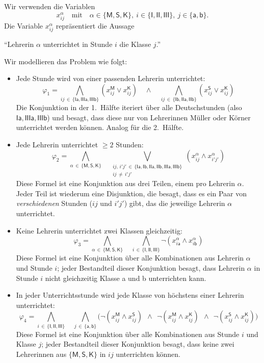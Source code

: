 \documentclass[fontsize=11pt, twoside=false, numbers=autoenddot]{scrbook}
\begin{document}
Wir verwenden die Variablen
\[
  x_{ij}^\alpha
  \quad\text{mit}\quad
  \alpha \in \{\textsf{M},\textsf{S},\textsf{K}\},~
  i \in \{\textsf{I},\textsf{II},\textsf{III}\},~
  j \in \{\textsf{a},\textsf{b}\}.
\]
Die Variable $x_{ij}^\alpha$ repräsentiert die Aussage
\begin{center}
  "`Lehrerin $\alpha$ unterrichtet in Stunde $i$ die Klasse $j$."'
\end{center}
Wir modellieren das Problem wie folgt:
\begin{itemize}
  \item
    Jede Stunde wird von einer passenden Lehrerin unterrichtet:
    \[
      \varphi_1 = 
      \bigwedge_{ij \,\in\, \{\textsf{Ia},\textsf{IIIa},\textsf{IIIb}\}} (x_{ij}^{\textsf{M}} \vee x_{ij}^{\textsf{K}})
      \quad\wedge\quad
      \bigwedge_{ij \,\in\, \{\textsf{Ib},\textsf{IIa},\textsf{IIb}\}} (x_{ij}^{\textsf{S}} \vee x_{ij}^{\textsf{K}})
    \]
    Die Konjunktion in der 1.\ Hälfte iteriert über alle Deutschstunden (also $\textsf{Ia},\textsf{IIIa},\textsf{IIIb}$)
    und besagt, dass diese nur von Lehrerinnen \textsf{M}üller oder \textsf{K}örner unterrichtet werden können.
    Analog für die 2.\ Hälfte.
  \item
    Jede Lehrerin unterrichtet $\geq 2$ Stunden:
    \[
      \varphi_2 =
      \bigwedge_{\alpha \,\in\, \{\textsf{M},\textsf{S},\textsf{K}\}}
      \quad
      \bigvee_{\substack{ij,\,i'\!j'\, \in\, \{\textsf{Ia},\textsf{Ib},\textsf{IIa},\textsf{IIb},\textsf{IIIa},\textsf{IIIb}\}\\ij\,\neq\,i'\!j'}} (x_{ij}^\alpha \wedge x_{i'\!j'}^\alpha)
    \]
    Diese Formel ist eine Konjunktion
    aus drei Teilen, einem pro Lehrerin $\alpha$.
    Jeder Teil ist wiederum eine Disjunktion,
    die besagt, dass es ein Paar von \emph{verschiedenen} Stunden ($ij$ und $i'\!j'$) gibt,
    das die jeweilige Lehrerin $\alpha$ unterrichtet.
  \item
    Keine Lehrerin unterrichtet zwei Klassen gleichzeitig:
    \[
      \varphi_3 =
      \bigwedge_{\alpha \,\in\, \{\textsf{M},\textsf{S},\textsf{K}\}}
      \quad
      \bigwedge_{i \,\in\, \{\textsf{I},\textsf{II},\textsf{III}\}} \neg(x_{i\textsf{a}}^\alpha \wedge x_{i\textsf{b}}^\alpha)
    \]
    Diese Formel ist eine Konjunktion über alle Kombinationen
    aus Lehrerin $\alpha$ und Stunde $i$;
    jeder Bestandteil dieser Konjunktion besagt, dass Lehrerin $\alpha$ in Stunde $i$ nicht gleichzeitig Klasse \textsf{a} und \textsf{b} unterrichten kann.
  \item
    In jeder Unterrichtsstunde wird jede Klasse von höchstens einer Lehrerin unterrichtet:
    \[
      \varphi_4 =
      \bigwedge_{i \,\in\, \{\textsf{I},\textsf{II},\textsf{III}\}}
      \quad
      \bigwedge_{j \,\in\, \{\textsf{a},\textsf{b}\}}
      \Big(
        \neg(x_{ij}^{\textsf{M}} \wedge x_{ij}^{\textsf{S}}) ~~\wedge~~
        \neg(x_{ij}^{\textsf{M}} \wedge x_{ij}^{\textsf{K}}) ~~\wedge~~
        \neg(x_{ij}^{\textsf{S}} \wedge x_{ij}^{\textsf{K}})
      \Big)
    \]
    Diese Formel ist eine Konjunktion über alle Kombinationen aus Stunde $i$ und Klasse $j$;
    jeder Bestandteil dieser Konjunktion besagt, dass keine zwei Lehrerinnen aus $\{\textsf{M},\textsf{S},\textsf{K}\}$
    in $ij$ unterrichten können.
\end{itemize}
\end{document}
